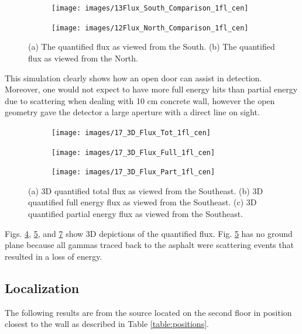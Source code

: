 \begin{figure}[!htb]
\begin{subfigure}[b]{0.55\textwidth}
   \centering
   \texttt{[image: images/13Flux\_South\_Comparison\_1fl\_cen]}
   \caption{}
   \label{fig:S1C}
\end{subfigure}
\begin{subfigure}[b]{0.55\textwidth}
   \centering
   \texttt{[image: images/12Flux\_North\_Comparison\_1fl\_cen]}
   \caption{}
   \label{fig:N1C}
\end{subfigure}
\caption{(a) The quantified flux as viewed from the South. (b) The quantified flux as viewed from the North.}
\end{figure}

\noindent This simulation clearly shows how an open door can assist in detection. Moreover, one would not expect to have more full energy hits than partial energy due to scattering when dealing with 10 cm concrete wall, however the open geometry gave the detector a large aperture with a direct line on sight.

\begin{figure}[!htb]
\begin{subfigure}[b]{0.55\textwidth}
   \centering
   \texttt{[image: images/17\_3D\_Flux\_Tot\_1fl\_cen]}
   \caption{}
   \label{fig:3DT1C}
\end{subfigure}
\begin{subfigure}[b]{0.55\textwidth}
   \centering
   \texttt{[image: images/17\_3D\_Flux\_Full\_1fl\_cen]}
   \caption{}
   \label{fig:3DF1C}
\end{subfigure}
\begin{subfigure}[b]{0.55\textwidth}
   \centering
   \texttt{[image: images/17\_3D\_Flux\_Part\_1fl\_cen]}
   \caption{}
   \label{fig:3DP1C}
\end{subfigure}
\caption{(a) 3D quantified total flux as viewed from the Southeast. (b) 3D quantified full energy flux as viewed from the Southeast. (c) 3D quantified partial energy flux as viewed from the Southeast.}
\end{figure}

Figs. \ref{fig:3DT1C}, \ref{fig:3DF1C}, and \ref{fig:3DP1C} show 3D depictions of the quantified flux. Fig. \ref{fig:3DF1C} has no ground plane because all gammas traced back to the asphalt were scattering events that resulted in a loss of energy.

\subsection{Localization}
\noindent The following results are from the source located on the second floor in position closest to the wall as described in Table \ref{table:positions}.

